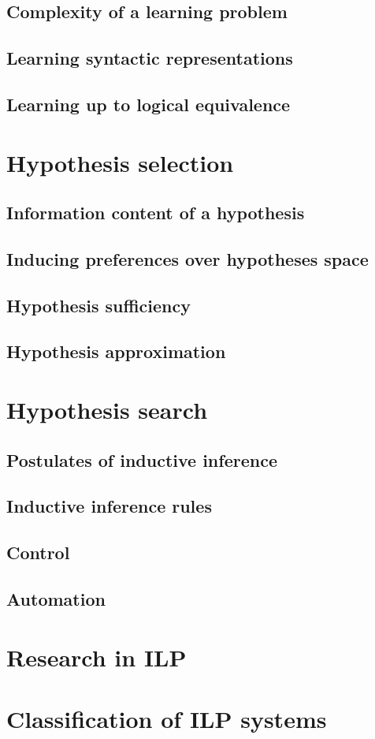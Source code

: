 \subsection{Complexity of a learning problem}
\subsection{Learning syntactic representations}
\subsection{Learning up to logical equivalence}
\section{Hypothesis selection}
\subsection{Information content of a hypothesis}
\subsection{Inducing preferences over hypotheses space}
\subsection{Hypothesis sufficiency}
\subsection{Hypothesis approximation}
\section{Hypothesis search}
\subsection{Postulates of inductive inference}
\subsection{Inductive inference rules}
\subsection{Control}
\subsection{Automation}
\section{Research in ILP}
\section{Classification of ILP systems}